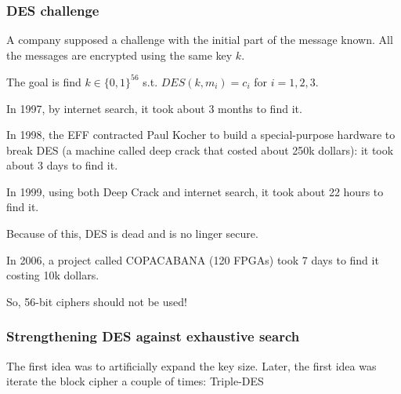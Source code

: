 \documentclass[12pt]{book}
\begin{document}
\subsubsection{DES challenge}
A company supposed a challenge with the initial part of the message known. All the messages are encrypted using the same key $k$.
\begin{center}
\end{center}The goal is find $k\in\{0,1\}^{56}$ s.t. $DES(k,m_{i})=c_{i}$ for $i=1,2,3$.

In 1997, by internet search, it took about 3 months to find it.

In 1998, the EFF contracted Paul Kocher to build a special-purpose hardware to break DES (a machine called deep crack that costed about 250k dollars): it took about 3 days to find it.

In 1999, using both Deep Crack and internet search, it took about 22 hours to find it.

Because of this, DES is dead and is no linger secure.

In 2006, a project called COPACABANA (120 FPGAs) took 7 days to find it costing 10k dollars.

So, 56-bit ciphers should not be used!

\subsubsection{Strengthening DES against exhaustive search}
The first idea was to artificially expand the key size. Later, the first idea was iterate the block cipher a couple of times: Triple-DES
\end{document}
